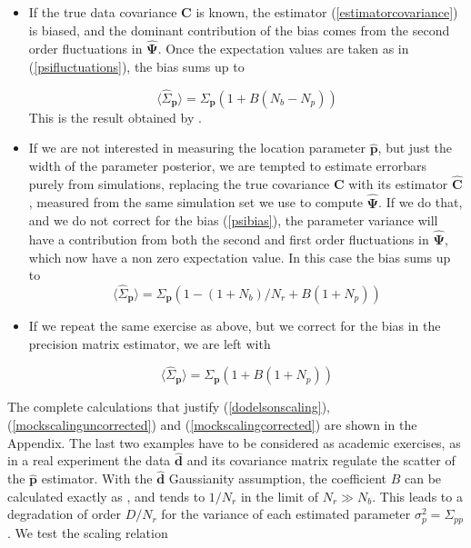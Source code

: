 \documentclass[reprint,aps,prd,superscriptaddress,showkeys,showpacs]{revtex4-1}
\newcommand{\bb}[1]{\mathbf{#1}}
\newcommand{\bbh}[1]{\mathbf{\hat{#1}}}
\newcommand{\h}[1]{\hat{#1}}
\begin{document}
\begin{itemize}
\item If the true data covariance $\bb{C}$ is known, the estimator (\ref{estimatorcovariance}) is biased, and the dominant contribution of the bias comes from the second order fluctuations in $\bbh{\Psi}$. Once the expectation values are taken as in (\ref{psifluctuations}), the bias sums up to 

\begin{equation}
\label{dodelsonscaling}
\langle\h{\Sigma}_\bb{p}\rangle=\Sigma_\bb{p}(1+B(N_b-N_p))
\end{equation}
%
This is the result obtained by \citep{DodelsonSchneider13}.

\item If we are not interested in measuring the location parameter $\bbh{p}$, but just the width of the parameter posterior, we are tempted to estimate errorbars purely from simulations, replacing the true covariance $\bb{C}$ with its estimator $\bbh{C}$, measured from the same simulation set we use to compute $\bbh{\Psi}$. If we do that, and we do not correct for the bias (\ref{psibias}), the parameter variance will have a contribution from both the second and first order fluctuations in $\bbh{\Psi}$, which now have a non zero expectation value. In this case the bias sums up to 
\begin{equation}
\label{mockscalinguncorrected}
\langle\h{\Sigma}_\bb{p}\rangle=\Sigma_\bb{p}(1-(1+N_b)/N_r+B(1+N_p))
\end{equation}

\item If we repeat the same exercise as above, but we correct for the bias in the precision matrix estimator, we are left with 

\begin{equation}
\label{mockscalingcorrected}
\langle\h{\Sigma}_\bb{p}\rangle=\Sigma_\bb{p}(1+B(1+N_p))
\end{equation}

\end{itemize} 
%
The complete calculations that justify (\ref{dodelsonscaling}),(\ref{mockscalinguncorrected}) and (\ref{mockscalingcorrected}) are shown in the Appendix. The last two examples have to be considered as academic exercises, as in a real experiment the data $\bbh{d}$ and its covariance matrix regulate the scatter of the $\bbh{p}$ estimator. With the $\bbh{d}$ Gaussianity assumption, the coefficient $B$ can be calculated exactly as \citep{DodelsonSchneider13,Taylor12}, and tends to $1/N_r$ in the limit of $N_r\gg N_b$. This leads to a degradation of order $D/N_r$ for the variance of each estimated parameter $\sigma^2_p=\Sigma_{pp}$. We test the scaling relation
\end{document}
